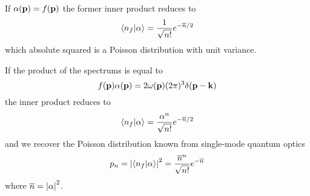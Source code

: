 \begin{corollary}
	If $\alpha(\vb{p})=f(\vb{p})$ the former inner product reduces to
	\begin{equation}
		\braket{n_f}{\alpha}
		=
		\frac{1}{\sqrt{n!}}
		e^{-\overline{n}/2}
	\end{equation}
	which absolute squared is a Poisson distribution with unit variance.
\end{corollary}
\begin{corollary}
	If the product of the spectrums is equal to
	\begin{equation}
		f(\vb{p})
		\alpha(\vb{p})
		=
		2\omega(\vb{p})
		(2\pi)^3
		\delta(\vb{p}-\vb{k})
	\end{equation}
	the inner product reduces to
	\begin{equation}
		\braket{n_f}{\alpha}
		=
		\frac{\alpha^n}{\sqrt{n!}}
		e^{-\overline{n}/2}
	\end{equation}
	and we recover the Poisson distribution known from single-mode quantum optics
	\begin{equation}
		p_n
		=
		\abs{\braket{n_f}{\alpha}}^2
		=
		\frac{\overline{n}^n}{\sqrt{n!}}
		e^{-\overline{n}}
	\end{equation}
	where $\overline{n}=\abs{\alpha}^2$.
\end{corollary}